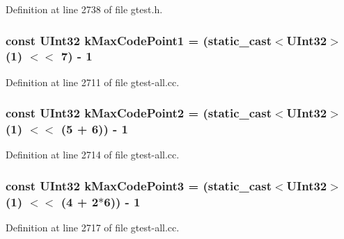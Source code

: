 \-Definition at line 2738 of file gtest.\-h.

\hypertarget{namespacetesting_1_1internal_a842ee44b2d352fa626e9c0cc37486e34}{
\subsubsection[{k\-Max\-Code\-Point1}]{\setlength{\rightskip}{0pt plus 5cm}const {\bf \-U\-Int32} {\bf k\-Max\-Code\-Point1} = (static\-\_\-cast$<${\bf \-U\-Int32}$>$(1) $<$$<$ 7) -\/ 1}}\label{d0/da7/namespacetesting_1_1internal_a842ee44b2d352fa626e9c0cc37486e34}


\-Definition at line 2711 of file gtest-\/all.\-cc.

\hypertarget{namespacetesting_1_1internal_af814f29030620a69d0c9e71c5d942990}{
\subsubsection[{k\-Max\-Code\-Point2}]{\setlength{\rightskip}{0pt plus 5cm}const {\bf \-U\-Int32} {\bf k\-Max\-Code\-Point2} = (static\-\_\-cast$<${\bf \-U\-Int32}$>$(1) $<$$<$ (5 + 6)) -\/ 1}}\label{d0/da7/namespacetesting_1_1internal_af814f29030620a69d0c9e71c5d942990}


\-Definition at line 2714 of file gtest-\/all.\-cc.

\hypertarget{namespacetesting_1_1internal_a47b4e6ab732c706ac60eb6be97424da9}{
\subsubsection[{k\-Max\-Code\-Point3}]{\setlength{\rightskip}{0pt plus 5cm}const {\bf \-U\-Int32} {\bf k\-Max\-Code\-Point3} = (static\-\_\-cast$<${\bf \-U\-Int32}$>$(1) $<$$<$ (4 + 2$\ast$6)) -\/ 1}}\label{d0/da7/namespacetesting_1_1internal_a47b4e6ab732c706ac60eb6be97424da9}


\-Definition at line 2717 of file gtest-\/all.\-cc.


